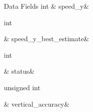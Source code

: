 \begin{DoxyFields}{Data Fields}
\hypertarget{a00004_a3abd5cb27c81871612651aee8a0476ba}{int}\label{a00004_a3abd5cb27c81871612651aee8a0476ba}
&
speed\-\_\-y&
\\
\hline

\hypertarget{a00004_abde97a528a4ffec3463df5f0f86cdbd2}{int}\label{a00004_abde97a528a4ffec3463df5f0f86cdbd2}
&
speed\-\_\-y\-\_\-best\-\_\-estimate&
\\
\hline

\hypertarget{a00004_a6e27f49150e9a14580fb313cc2777e00}{int}\label{a00004_a6e27f49150e9a14580fb313cc2777e00}
&
status&
\\
\hline

\hypertarget{a00004_a7db3f1dc8cddb85428225e000e94c5f3}{unsigned int}\label{a00004_a7db3f1dc8cddb85428225e000e94c5f3}
&
vertical\-\_\-accuracy&
\\
\hline

\end{DoxyFields}
\label{d7/d70/a00106}
\hypertarget{a00004_d7/d70/a00106}{}
